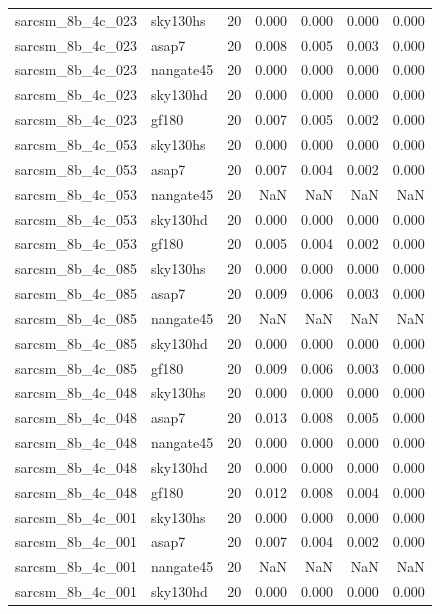 \begin{tabular}{llrrrrr}
sarcsm\_8b\_4c\_023 & sky130hs & 20 & 0.000 & 0.000 & 0.000 & 0.000 \\
sarcsm\_8b\_4c\_023 & asap7 & 20 & 0.008 & 0.005 & 0.003 & 0.000 \\
sarcsm\_8b\_4c\_023 & nangate45 & 20 & 0.000 & 0.000 & 0.000 & 0.000 \\
sarcsm\_8b\_4c\_023 & sky130hd & 20 & 0.000 & 0.000 & 0.000 & 0.000 \\
sarcsm\_8b\_4c\_023 & gf180 & 20 & 0.007 & 0.005 & 0.002 & 0.000 \\
sarcsm\_8b\_4c\_053 & sky130hs & 20 & 0.000 & 0.000 & 0.000 & 0.000 \\
sarcsm\_8b\_4c\_053 & asap7 & 20 & 0.007 & 0.004 & 0.002 & 0.000 \\
sarcsm\_8b\_4c\_053 & nangate45 & 20 & NaN & NaN & NaN & NaN \\
sarcsm\_8b\_4c\_053 & sky130hd & 20 & 0.000 & 0.000 & 0.000 & 0.000 \\
sarcsm\_8b\_4c\_053 & gf180 & 20 & 0.005 & 0.004 & 0.002 & 0.000 \\
sarcsm\_8b\_4c\_085 & sky130hs & 20 & 0.000 & 0.000 & 0.000 & 0.000 \\
sarcsm\_8b\_4c\_085 & asap7 & 20 & 0.009 & 0.006 & 0.003 & 0.000 \\
sarcsm\_8b\_4c\_085 & nangate45 & 20 & NaN & NaN & NaN & NaN \\
sarcsm\_8b\_4c\_085 & sky130hd & 20 & 0.000 & 0.000 & 0.000 & 0.000 \\
sarcsm\_8b\_4c\_085 & gf180 & 20 & 0.009 & 0.006 & 0.003 & 0.000 \\
sarcsm\_8b\_4c\_048 & sky130hs & 20 & 0.000 & 0.000 & 0.000 & 0.000 \\
sarcsm\_8b\_4c\_048 & asap7 & 20 & 0.013 & 0.008 & 0.005 & 0.000 \\
sarcsm\_8b\_4c\_048 & nangate45 & 20 & 0.000 & 0.000 & 0.000 & 0.000 \\
sarcsm\_8b\_4c\_048 & sky130hd & 20 & 0.000 & 0.000 & 0.000 & 0.000 \\
sarcsm\_8b\_4c\_048 & gf180 & 20 & 0.012 & 0.008 & 0.004 & 0.000 \\
sarcsm\_8b\_4c\_001 & sky130hs & 20 & 0.000 & 0.000 & 0.000 & 0.000 \\
sarcsm\_8b\_4c\_001 & asap7 & 20 & 0.007 & 0.004 & 0.002 & 0.000 \\
sarcsm\_8b\_4c\_001 & nangate45 & 20 & NaN & NaN & NaN & NaN \\
sarcsm\_8b\_4c\_001 & sky130hd & 20 & 0.000 & 0.000 & 0.000 & 0.000 \\

\end{tabular}
